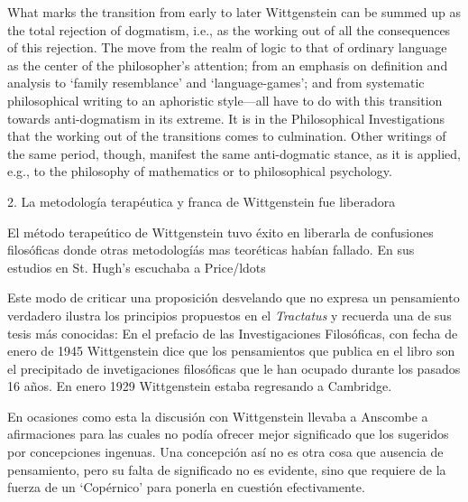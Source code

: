       \begin{revision}
      What marks the transition from early to later Wittgenstein can be summed up as
      the total rejection of dogmatism, i.e., as the working out of all the
      consequences of this rejection. The move from the realm of logic to that of
      ordinary language as the center of the philosopher's attention; from an emphasis
      on definition and analysis to ‘family resemblance’ and ‘language-games’; and
      from systematic philosophical writing to an aphoristic style—all have to do with
      this transition towards anti-dogmatism in its extreme. It is in the
      Philosophical Investigations that the working out of the transitions comes to
      culmination. Other writings of the same period, though, manifest the same
      anti-dogmatic stance, as it is applied, e.g., to the philosophy of mathematics
      or to philosophical psychology.
      \end{revision}




      2. La metodología terapéutica y franca de Wittgenstein fue liberadora
      \begin{revision}



      El método terapeútico de Wittgenstein tuvo éxito en liberarla de confusiones
      filosóficas donde otras metodologíás mas teoréticas habían fallado. En sus
      estudios en St. Hugh's escuchaba a Price/ldots
      \end{revision}


      \begin{revision}
      Este modo de criticar una proposición desvelando que no expresa un pensamiento
      verdadero ilustra los principios propuestos en el \emph{Tractatus} y recuerda
      una de sus tesis más conocidas: 
      En el prefacio de las Investigaciones Filosóficas, con fecha de enero de 1945
      Wittgenstein dice que los pensamientos que publica en el libro son el
      precipitado de invetigaciones filosóficas que le han ocupado durante los pasados
      16 años. En enero 1929 Wittgenstein estaba regresando a Cambridge.
      \end{revision}


      \begin{revision}
      En ocasiones como esta la
      discusión con Wittgenstein llevaba a Anscombe a afirmaciones para las cuales no
      podía ofrecer mejor significado que los sugeridos por concepciones ingenuas. Una
      concepción así no es otra cosa que ausencia de pensamiento, pero su falta de
      significado no es evidente, sino que requiere de la fuerza de un `Copérnico'
      para ponerla en cuestión efectivamente.\autocite[cf. 151]{IWT} 
      \end{revision}

